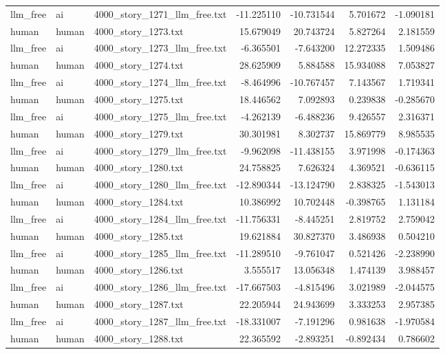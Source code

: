 \begin{longtable}{lllrrrr}
llm\_free & ai & 4000\_story\_1271\_llm\_free.txt & -11.225110 & -10.731544 & 5.701672 & -1.090181 \\
human & human & 4000\_story\_1273.txt & 15.679049 & 20.743724 & 5.827264 & 2.181559 \\
llm\_free & ai & 4000\_story\_1273\_llm\_free.txt & -6.365501 & -7.643200 & 12.272335 & 1.509486 \\
human & human & 4000\_story\_1274.txt & 28.625909 & 5.884588 & 15.934088 & 7.053827 \\
llm\_free & ai & 4000\_story\_1274\_llm\_free.txt & -8.464996 & -10.767457 & 7.143567 & 1.719341 \\
human & human & 4000\_story\_1275.txt & 18.446562 & 7.092893 & 0.239838 & -0.285670 \\
llm\_free & ai & 4000\_story\_1275\_llm\_free.txt & -4.262139 & -6.488236 & 9.426557 & 2.316371 \\
human & human & 4000\_story\_1279.txt & 30.301981 & 8.302737 & 15.869779 & 8.985535 \\
llm\_free & ai & 4000\_story\_1279\_llm\_free.txt & -9.962098 & -11.438155 & 3.971998 & -0.174363 \\
human & human & 4000\_story\_1280.txt & 24.758825 & 7.626324 & 4.369521 & -0.636115 \\
llm\_free & ai & 4000\_story\_1280\_llm\_free.txt & -12.890344 & -13.124790 & 2.838325 & -1.543013 \\
human & human & 4000\_story\_1284.txt & 10.386992 & 10.702448 & -0.398765 & 1.131184 \\
llm\_free & ai & 4000\_story\_1284\_llm\_free.txt & -11.756331 & -8.445251 & 2.819752 & 2.759042 \\
human & human & 4000\_story\_1285.txt & 19.621884 & 30.827370 & 3.486938 & 0.504210 \\
llm\_free & ai & 4000\_story\_1285\_llm\_free.txt & -11.289510 & -9.761047 & 0.521426 & -2.238990 \\
human & human & 4000\_story\_1286.txt & 3.555517 & 13.056348 & 1.474139 & 3.988457 \\
llm\_free & ai & 4000\_story\_1286\_llm\_free.txt & -17.667503 & -4.815496 & 3.021989 & -2.044575 \\
human & human & 4000\_story\_1287.txt & 22.205944 & 24.943699 & 3.333253 & 2.957385 \\
llm\_free & ai & 4000\_story\_1287\_llm\_free.txt & -18.331007 & -7.191296 & 0.981638 & -1.970584 \\
human & human & 4000\_story\_1288.txt & 22.365592 & -2.893251 & -0.892434 & 0.786602 \\

\end{longtable}
